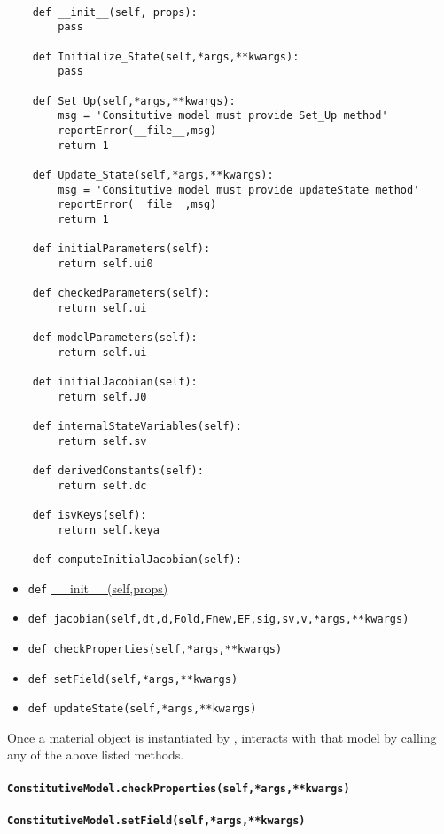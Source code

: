 \documentclass[11pt]{article}
\newcommand{\payette}{{\sc{Payette}}}
\begin{document}
\begin{verbatim}

    def __init__(self, props):
        pass

    def Initialize_State(self,*args,**kwargs):
        pass

    def Set_Up(self,*args,**kwargs):
        msg = 'Consitutive model must provide Set_Up method'
        reportError(__file__,msg)
        return 1

    def Update_State(self,*args,**kwargs):
        msg = 'Consitutive model must provide updateState method'
        reportError(__file__,msg)
        return 1

    def initialParameters(self):
        return self.ui0

    def checkedParameters(self):
        return self.ui

    def modelParameters(self):
        return self.ui

    def initialJacobian(self):
        return self.J0

    def internalStateVariables(self):
        return self.sv

    def derivedConstants(self):
        return self.dc

    def isvKeys(self):
        return self.keya

    def computeInitialJacobian(self):
\end{verbatim}
\begin{itemize}
  \item \texttt{def} \url{__init__(self,props)}
  \item \texttt{def jacobian(self,dt,d,Fold,Fnew,EF,sig,sv,v,*args,**kwargs)}
  \item \texttt{def checkProperties(self,*args,**kwargs)}
  \item \texttt{def setField(self,*args,**kwargs)}
  \item \texttt{def updateState(self,*args,**kwargs)}
\end{itemize}

Once a material object is instantiated by \payette{}, \payette{} interacts with
that model by calling any of the above listed methods.

\paragraph{\texttt{ConstitutiveModel.\textbf{checkProperties}(self,*args,**kwargs)}}
\paragraph{\texttt{ConstitutiveModel.\textbf{setField}(self,*args,**kwargs)}}
\end{document}
